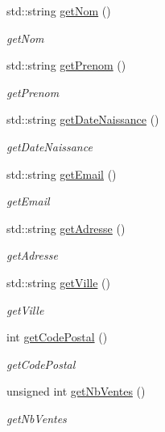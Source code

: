 \begin{DoxyCompactItemize}
std\-::string \hyperlink{class_utilisateur_a01193c02978c04db73159956766d16f7}{get\-Nom} ()
\begin{DoxyCompactList}\small\item\em get\-Nom \end{DoxyCompactList}\item 
std\-::string \hyperlink{class_utilisateur_a5dc57c74e8a7fc4b48cfb2e87e86c475}{get\-Prenom} ()
\begin{DoxyCompactList}\small\item\em get\-Prenom \end{DoxyCompactList}\item 
std\-::string \hyperlink{class_utilisateur_a5f708e481078a52e437fd803fb2754c3}{get\-Date\-Naissance} ()
\begin{DoxyCompactList}\small\item\em get\-Date\-Naissance \end{DoxyCompactList}\item 
std\-::string \hyperlink{class_utilisateur_a32500914e95bff7890687684e9123c81}{get\-Email} ()
\begin{DoxyCompactList}\small\item\em get\-Email \end{DoxyCompactList}\item 
std\-::string \hyperlink{class_utilisateur_a6a710d004e4ec1a8ab44affd3cf479d5}{get\-Adresse} ()
\begin{DoxyCompactList}\small\item\em get\-Adresse \end{DoxyCompactList}\item 
std\-::string \hyperlink{class_utilisateur_a92ea3c0723ec1303026b9c99b98d70ce}{get\-Ville} ()
\begin{DoxyCompactList}\small\item\em get\-Ville \end{DoxyCompactList}\item 
int \hyperlink{class_utilisateur_ac49c4d66a37d0296e50f9b6cedf4284f}{get\-Code\-Postal} ()
\begin{DoxyCompactList}\small\item\em get\-Code\-Postal \end{DoxyCompactList}\item 
unsigned int \hyperlink{class_utilisateur_a54a9cce39f989f920b93ca2675d6999c}{get\-Nb\-Ventes} ()
\begin{DoxyCompactList}\small\item\em get\-Nb\-Ventes \end{DoxyCompactList}\item 

\end{DoxyCompactItemize}

